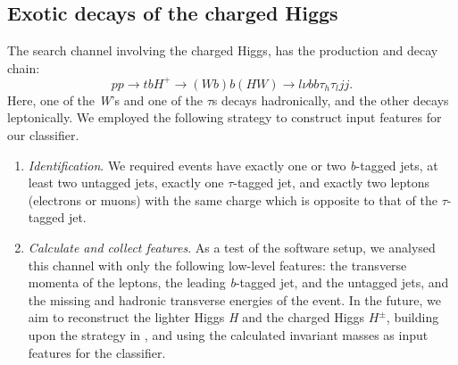 {\subsection{Exotic decays of the charged Higgs}\label{subsec:Hpm_analysis}
The search channel involving the charged Higgs, has the production and decay chain: 
\[pp\rightarrow tbH^+\rightarrow (Wb)b(HW)\rightarrow l\nu bb\tau_h\tau_ljj.\]
Here, one of the \emph{W}'s and one of the $\tau$s decays hadronically, and the other decays leptonically.
We employed the following strategy to construct input features for our classifier. 
\begin{enumerate}
  \item \emph{Identification}. We required events have exactly one or two \emph{b}-tagged jets, at least two untagged jets, exactly one $\tau$-tagged jet, and exactly two leptons (electrons or muons) with the same charge which is opposite to that of the $\tau$-tagged jet.
  \item\emph{Calculate and collect features}. As a test of the software setup, we analysed this channel with only the following low-level features: the transverse momenta of the leptons, the leading \emph{b}-tagged jet, and the untagged jets, and the missing and hadronic transverse energies of the event. In the future, we aim to reconstruct the lighter Higgs \emph{H} and the charged Higgs $H^\pm$, building upon the strategy in \cite{Coleppa2014a}, and using the calculated invariant masses as input features for the classifier.
\end{enumerate}

}
